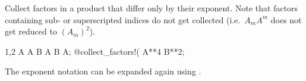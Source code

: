 
Collect factors in a product that differ only by their exponent. Note
that factors containing sub- or superscripted indices do not get
collected (i.e.~$A_m A^m$ does not get reduced to $(A_m)^2$).
\begin{screen}{1,2}
A A B A B A;
@collect_factors!(%
A**4 B**2;
\end{screen}
The exponent notation can be expanded again using .
~

